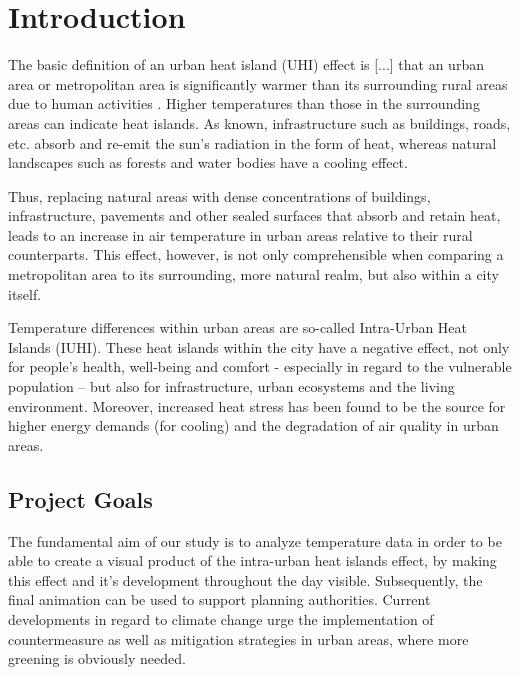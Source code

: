 
\section{Introduction}

The basic definition of an urban heat island (UHI) effect is \ldq{}[...] that an urban area or metropolitan area is significantly warmer than its surrounding rural areas due to human activities\rdq{} \cite{takebayashi_chapter_2020}. Higher temperatures than those in the surrounding areas can indicate heat islands. As known, infrastructure such as buildings, roads, etc. absorb and re-emit the sun’s radiation in the form of heat, whereas natural landscapes such as forests and water bodies have a cooling effect. \cite{us_epa_learn_2014}

Thus, replacing natural areas with dense concentrations of buildings, infrastructure, pavements and other sealed surfaces that absorb and retain heat, leads to an increase in air temperature in urban areas relative to their rural counterparts. This effect, however, is not only comprehensible when comparing a metropolitan area to its surrounding, more natural realm, but also within a city itself. 

Temperature differences within urban areas are so-called \ldq{}Intra-Urban Heat Islands (IUHI)\rdq{}. \cite{bruns_stable_2017}
These heat islands within the city have a negative effect, not only for people’s health, well-being and comfort - especially in regard to the vulnerable population – but also for infrastructure, urban ecosystems and the living environment. Moreover, increased heat stress has been found to be the source for higher energy demands (for cooling) and the degradation of air quality in urban areas. \cite{mohajerani_urban_2017}

\subsection{Project Goals}

The fundamental aim of our study is to analyze temperature data in order to be able to create a visual product of the intra-urban heat islands effect, by making this effect and it's development throughout the day visible. Subsequently, the final animation can be used to support planning authorities. Current developments in regard to climate change urge the implementation of countermeasure as well as mitigation strategies in urban areas, where more greening is obviously needed. \cite{ketterer_comparison_2015}

